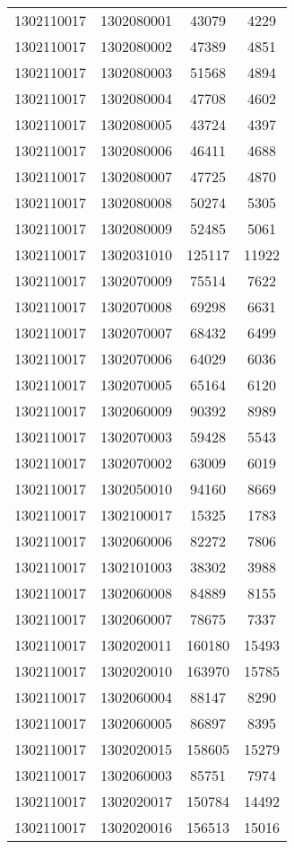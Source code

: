 \begin{longtable}[h]{llcc}
		1302110017 & 1302080001 & 43079 & 4229\\
		1302110017 & 1302080002 & 47389 & 4851\\
		1302110017 & 1302080003 & 51568 & 4894\\
		1302110017 & 1302080004 & 47708 & 4602\\
		1302110017 & 1302080005 & 43724 & 4397\\
		1302110017 & 1302080006 & 46411 & 4688\\
		1302110017 & 1302080007 & 47725 & 4870\\
		1302110017 & 1302080008 & 50274 & 5305\\
		1302110017 & 1302080009 & 52485 & 5061\\
		1302110017 & 1302031010 & 125117 & 11922\\
		1302110017 & 1302070009 & 75514 & 7622\\
		1302110017 & 1302070008 & 69298 & 6631\\
		1302110017 & 1302070007 & 68432 & 6499\\
		1302110017 & 1302070006 & 64029 & 6036\\
		1302110017 & 1302070005 & 65164 & 6120\\
		1302110017 & 1302060009 & 90392 & 8989\\
		1302110017 & 1302070003 & 59428 & 5543\\
		1302110017 & 1302070002 & 63009 & 6019\\
		1302110017 & 1302050010 & 94160 & 8669\\
		1302110017 & 1302100017 & 15325 & 1783\\
		1302110017 & 1302060006 & 82272 & 7806\\
		1302110017 & 1302101003 & 38302 & 3988\\
		1302110017 & 1302060008 & 84889 & 8155\\
		1302110017 & 1302060007 & 78675 & 7337\\
		1302110017 & 1302020011 & 160180 & 15493\\
		1302110017 & 1302020010 & 163970 & 15785\\
		1302110017 & 1302060004 & 88147 & 8290\\
		1302110017 & 1302060005 & 86897 & 8395\\
		1302110017 & 1302020015 & 158605 & 15279\\
		1302110017 & 1302060003 & 85751 & 7974\\
		1302110017 & 1302020017 & 150784 & 14492\\
		1302110017 & 1302020016 & 156513 & 15016\\

\end{longtable}
